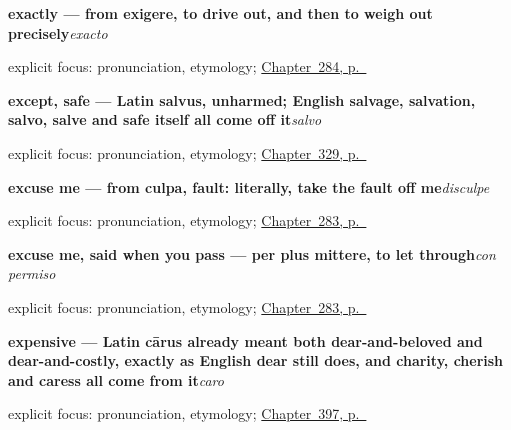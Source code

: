 \noindent\begin{minipage}[t]{\linewidth}
\raggedright
\textbf{exactly — from exigere, to drive out, and then to weigh out precisely}\enspace\emph{exacto}\par
\footnotesize explicit focus: pronunciation, etymology; \hyperref[ch:respuestas-cortas]{Chapter~284, p.~\pageref*{ch:respuestas-cortas}}
\end{minipage}\par\smallskip

\noindent\begin{minipage}[t]{\linewidth}
\raggedright
\textbf{except, safe — Latin salvus, unharmed; English salvage, salvation, salvo, salve and safe itself all come off it}\enspace\emph{salvo}\par
\footnotesize explicit focus: pronunciation, etymology; \hyperref[ch:tal-y-salvo]{Chapter~329, p.~\pageref*{ch:tal-y-salvo}}
\end{minipage}\par\smallskip

\noindent\begin{minipage}[t]{\linewidth}
\raggedright
\textbf{excuse me — from culpa, fault: literally, take the fault off me}\enspace\emph{disculpe}\par
\footnotesize explicit focus: pronunciation, etymology; \hyperref[ch:cortesia]{Chapter~283, p.~\pageref*{ch:cortesia}}
\end{minipage}\par\smallskip

\noindent\begin{minipage}[t]{\linewidth}
\raggedright
\textbf{excuse me, said when you pass — per plus mittere, to let through}\enspace\emph{con permiso}\par
\footnotesize explicit focus: pronunciation, etymology; \hyperref[ch:cortesia]{Chapter~283, p.~\pageref*{ch:cortesia}}
\end{minipage}\par\smallskip

\noindent\begin{minipage}[t]{\linewidth}
\raggedright
\textbf{expensive — Latin cārus already meant both dear-and-beloved and dear-and-costly, exactly as English dear still does, and charity, cherish and caress all come from it}\enspace\emph{caro}\par
\footnotesize explicit focus: pronunciation, etymology; \hyperref[ch:barato-y-caro]{Chapter~397, p.~\pageref*{ch:barato-y-caro}}
\end{minipage}\par\smallskip

